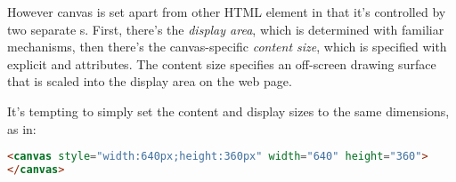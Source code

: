 However canvas is set apart from other HTML element in that it's controlled by two separate s.  First, there's the \emph{display area}, which is determined with familiar  mechanisms, then there's the canvas-specific \emph{content size}, which is specified with explicit  and  attributes.  The content size specifies an off-screen drawing surface that is scaled into the display area on the web page.

It's tempting to simply set the content and display sizes to the same dimensions, as in:

\begin{lstlisting}[language=HTML]
<canvas style="width:640px;height:360px" width="640" height="360">
</canvas>
\end{lstlisting}

